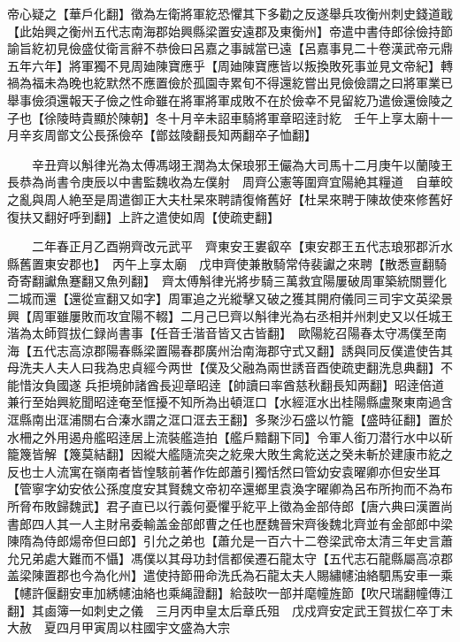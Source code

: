 帝心疑之【華戶化翻】徵為左衛將軍紇恐懼其下多勸之反遂舉兵攻衡州刺史錢道戢【此始興之衡州五代志南海郡始興縣梁置安遠郡及東衡州】帝遣中書侍郎徐儉持節諭旨紇初見儉盛仗衛言辭不恭儉曰呂嘉之事誠當已遠【呂嘉事見二十卷漢武帝元鼎五年六年】將軍獨不見周廸陳寶應乎【周廸陳寶應皆以叛換敗死事並見文帝紀】轉禍為福未為晚也紇默然不應置儉於孤園寺累旬不得還紇嘗出見儉儉謂之曰將軍業已舉事儉須還報天子儉之性命雖在將軍將軍成敗不在於儉幸不見留紇乃遣儉還儉陵之子也【徐陵時貴顯於陳朝】冬十月辛未詔車騎將軍章昭逹討紇　壬午上享太廟十一月辛亥周鄫文公長孫儉卒【鄫兹陵翻長知两翻卒子恤翻】

　　辛丑齊以斛律光為太傅馮翊王潤為太保琅邪王儼為大司馬十二月庚午以蘭陵王長恭為尚書令庚辰以中書監魏收為左僕射　周齊公憲等圍齊宜陽絶其糧道　自華皎之亂與周人絶至是周遣御正大夫杜杲來聘請復脩舊好【杜杲來聘于陳故使來修舊好復扶又翻好呼到翻】上許之遣使如周【使疏吏翻】

　　二年春正月乙酉朔齊改元武平　齊東安王婁叡卒【東安郡王五代志琅邪郡沂水縣舊置東安郡也】　丙午上享太廟　戊申齊使兼散騎常侍裴讞之來聘【散悉亶翻騎奇寄翻讞魚蹇翻又魚列翻】　齊太傅斛律光將步騎三萬救宜陽屢破周軍築統關豐化二城而還【還從宣翻又如字】周軍追之光縱擊又破之獲其開府儀同三司宇文英梁景興【周軍雖屢敗而攻宜陽不輟】二月己巳齊以斛律光為右丞相并州刺史又以任城王湝為太師賀拔仁録尚書事【任音壬湝音皆又古皆翻】　歐陽紇召陽春太守馮僕至南海【五代志高涼郡陽春縣梁置陽春郡廣州治南海郡守式又翻】誘與同反僕遣使告其母洗夫人夫人曰我為忠貞經今两世【僕及父融為兩世誘音酉使疏吏翻洗息典翻】不能惜汝負國遂兵拒境帥諸酋長迎章昭逹【帥讀曰率酋慈秋翻長知两翻】昭逹倍道兼行至始興紇聞昭逹奄至恇擾不知所為出頓洭口【水經洭水出桂陽縣盧聚東南過含洭縣南出洭浦關右合溱水謂之洭口洭去王翻】多聚沙石盛以竹籠【盛時征翻】置於水柵之外用遏舟艦昭逹居上流裝艦造拍【艦戶黯翻下同】令軍人銜刀潜行水中以斫籠篾皆解【篾莫結翻】因縱大艦隨流突之紇衆大敗生禽紇送之癸未斬於建康市紇之反也士人流寓在嶺南者皆惶駭前著作佐郎蕭引獨恬然曰管幼安袁曜卿亦但安坐耳【管寧字幼安依公孫度度安其賢魏文帝初卒還鄉里袁渙字曜卿為呂布所拘而不為布所脅布敗歸魏武】君子直已以行義何憂懼乎紇平上徵為金部侍郎【唐六典曰漢置尚書郎四人其一人主財帛委輸盖金部郎曹之任也歷魏晉宋齊後魏北齊並有金部郎中梁陳隋為侍郎煬帝但曰郎】引允之弟也【蕭允是一百六十二卷梁武帝太清三年史言蕭允兄弟處大難而不懾】馮僕以其母功封信都侯遷石龍太守【五代志石龍縣屬高凉郡盖梁陳置郡也今為化州】遣使持節冊命洗氏為石龍太夫人賜繡幰油絡駟馬安車一乘【幰許偃翻安車加綉幰油絡也乘䋲證翻】給鼓吹一部并麾幢旌節【吹尺瑞翻幢傳江翻】其鹵簿一如刺史之儀　三月丙申皇太后章氏殂　戊戍齊安定武王賀拔仁卒丁未大赦　夏四月甲寅周以柱國宇文盛為大宗

